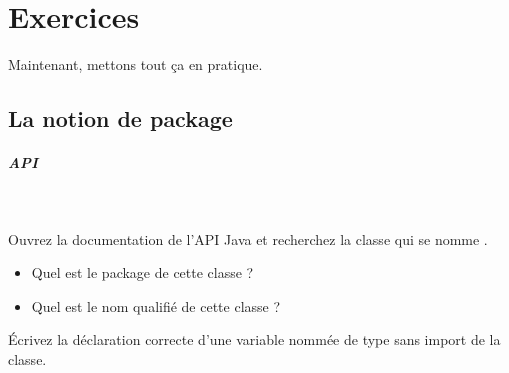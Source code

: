 \documentclass[11pt,a4paper]{article}
\begin{document}
            \par
        
			\par\medskip\section{Exercices}
				Maintenant, mettons tout \c ca en pratique.
      
            \par
        \subsection{La notion de package}
			
		\subparagraph{API} 
		
                \textcolor{white}{.} \par
            
								Ouvrez la documentation de l'API Java 
								et recherchez la classe qui se nomme
								\verb@IllegalFormatException@.
							
            \par
        
					\begin{itemize}
				
			\item 
									Quel est le package de cette classe ?   
									 \textcolor{gray}{\underline{\hspace*{10em}}} 
			\item 
									Quel est le nom qualifi\'e de cette classe ?\par
				 \textcolor{gray}{\underline{\hspace*{20em}}} 
					\end{itemize}
				
								\'Ecrivez la d\'eclaration correcte d'une variable nomm\'ee
								\verb@clavier@ de type 
								\verb@Scanner@ sans import de la classe.
							
            \par
         \textcolor{gray}{\underline{\hspace*{16em}}}  \textcolor{gray}{\underline{\hspace*{5em}}} 
            \par
        
\end{document}
